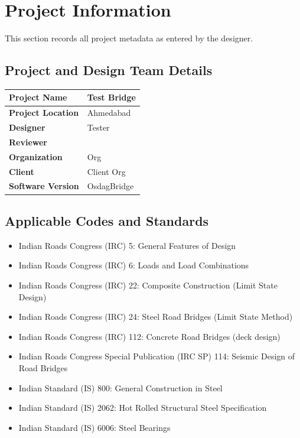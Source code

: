 \documentclass[12pt,a4paper]{report}
\numberwithin{table}{chapter}
\numberwithin{figure}{chapter}
\begin{document}
\titleformat{\chapter}[block]{\normalfont\Large\bfseries\centering}{\thechapter}{1em}{}
\titlespacing*{\chapter}{0pt}{-30pt}{10pt}


\chapter{Project Information}

This section records all project metadata as entered by the designer.

\section{Project and Design Team Details}
\label{sec:project-details}

\begin{tabular}{|L{5.5cm}|L{8.5cm}|}
\hline
\textbf{Project Name} & Test Bridge \\
\hline
\textbf{Project Location} & Ahmedabad \\
\hline
\textbf{Designer} & Tester \\
\hline
\textbf{Reviewer} &  \\
\hline
\textbf{Organization} & Org \\
\hline
\textbf{Client} & Client Org \\
\hline
\textbf{Software Version} & OsdagBridge \\
\hline
\end{tabular}


\section{Applicable Codes and Standards}
\label{sec:codes}

\begin{itemize}
\item Indian Roads Congress (IRC) 5: General Features of Design
\item Indian Roads Congress (IRC) 6: Loads and Load Combinations
\item Indian Roads Congress (IRC) 22: Composite Construction (Limit State Design)
\item Indian Roads Congress (IRC) 24: Steel Road Bridges (Limit State Method)
\item Indian Roads Congress (IRC) 112: Concrete Road Bridges (deck design)
\item Indian Roads Congress Special Publication (IRC SP) 114: Seismic Design of Road Bridges
\item Indian Standard (IS) 800: General Construction in Steel
\item Indian Standard (IS) 2062: Hot Rolled Structural Steel Specification
\item Indian Standard (IS) 6006: Steel Bearings
\end{itemize}
\end{document}
